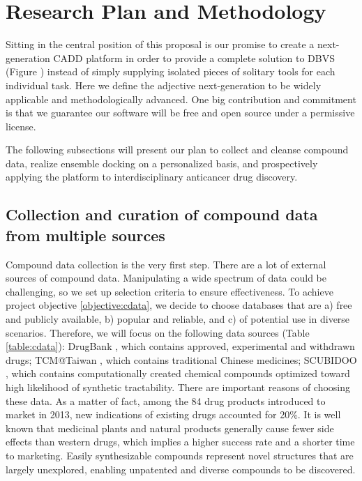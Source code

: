 \documentclass[a4paper,12pt]{article}
\begin{document}
\section*{Research Plan and Methodology}

Sitting in the central position of this proposal is our promise to create a next-generation CADD platform in order to provide a complete solution to DBVS (Figure ) instead of simply supplying isolated pieces of solitary tools for each individual task. Here we define the adjective next-generation to be widely applicable and methodologically advanced. One big contribution and commitment is that we guarantee our software will be free and open source under a permissive license.

The following subsections will present our plan to collect and cleanse compound data, realize ensemble docking on a personalized basis, and prospectively applying the platform to interdisciplinary anticancer drug discovery.

\subsection*{Collection and curation of compound data from multiple sources}

Compound data collection is the very first step. There are a lot of external sources of compound data. Manipulating a wide spectrum of data could be challenging, so we set up selection criteria to ensure effectiveness. To achieve project objective \ref{objective:cdata}, we decide to choose databases that are a) free and publicly available, b) popular and reliable, and c) of potential use in diverse scenarios. Therefore, we will focus on the following data sources (Table \ref{table:cdata}): DrugBank \citep{1594}, which contains approved, experimental and withdrawn drugs; TCM@Taiwan \citep{528}, which contains traditional Chinese medicines; SCUBIDOO \citep{1682}, which contains computationally created chemical compounds optimized toward high likelihood of synthetic tractability. There are important reasons of choosing these data. As a matter of fact, among the 84 drug products introduced to market in 2013, new indications of existing drugs accounted for 20\%. It is well known that medicinal plants and natural products generally cause fewer side effects than western drugs, which implies a higher success rate and a shorter time to marketing. Easily synthesizable compounds represent novel structures that are largely unexplored, enabling unpatented and diverse compounds to be discovered.
\end{document}

